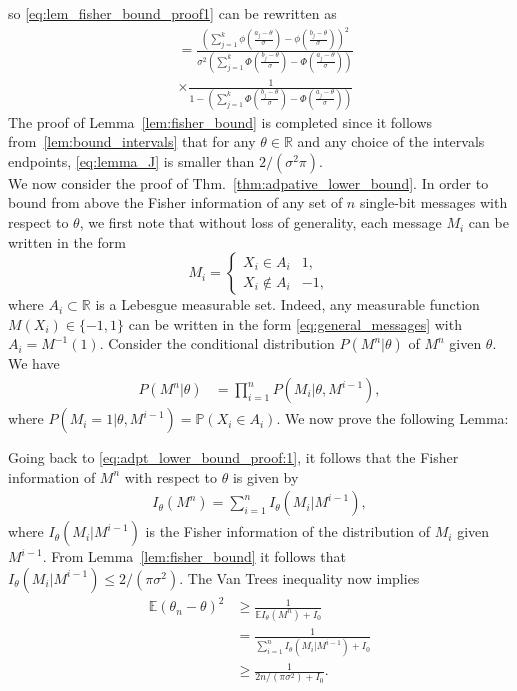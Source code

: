\documentclass[letterpaper, conference]{IEEEtran}      %
\begin{document}
so \eqref{eq:lem_fisher_bound_proof1} can be rewritten as
\begin{align}
& =   \frac { \left( \sum_{j=1}^{k} \phi \left(\frac{a_j-\theta}{\sigma} \right) - \phi \left( \frac{b_j-\theta} {\sigma} \right)  \right)^2 } 
{\sigma^2 \left( \sum_{j=1}^k \Phi \left( \frac{b_j-\theta }{\sigma}\right) - \Phi \left( \frac{a_j-\theta }{\sigma}\right)  \right) }  \nonumber \\
& \times \frac {1} 
{1- \left( \sum_{j=1}^k \Phi \left( \frac{b_j-\theta }{\sigma}\right) - \Phi \left( \frac{a_j-\theta }{\sigma}\right)  \right) } 
\label{eq:lemma_J}
\end{align}
The proof of Lemma~\ref{lem:fisher_bound} is completed since it follows from~\ref{lem:bound_intervals} that for any $\theta \in \mathbb R$ and any choice of the intervals endpoints, \eqref{eq:lemma_J} is smaller than $2/(\sigma^2 \pi)$. \\


We now consider the proof of Thm.~\ref{thm:adpative_lower_bound}. In order to bound from above the Fisher information of any set of $n$ single-bit messages with respect to $\theta$, we first note that without loss of generality, each message $M_i$ can be written in the form
\begin{equation}
\label{eq:general_messages}
M_i = \begin{cases}
X_i \in A_i & 1, \\
X_i \notin A_i & -1,
\end{cases} 
\end{equation}
where $A_i \subset \mathbb R$ is a Lebesgue measurable set. Indeed, any measurable function $M(X_i) \in \{-1,1\}$ can be written in the form \eqref{eq:general_messages} with $A_i = M^{-1}(1)$. Consider the conditional distribution $P({M^n|\theta})$ of $M^n$ given $\theta$. We have 
\begin{align}
P\left( M^n | \theta \right) & =  \prod_{i=1}^n P\left(M_i | \theta, M^{i-1} \right), \label{eq:adpt_lower_bound_proof:1}
\end{align}
where $P\left(M_i =1 | \theta, M^{i-1}  \right) = \mathbb P\left( X_i \in A_i\right)$. We now prove the following Lemma:



Going back to \eqref{eq:adpt_lower_bound_proof:1}, it follows that the Fisher information of $M^n$ with respect to $\theta$ is given by 
\begin{align}
I_\theta(M^n) = \sum_{i=1}^n I_\theta (M_i|M^{i-1}),
\label{eq:fisher_information}
\end{align}
where $I_\theta (M_i|M^{i-1})$ is the Fisher information of the distribution of $M_i$ given $M^{i-1}$. From Lemma~\ref{lem:fisher_bound} it follows that $I_\theta (M_i|M^{i-1}) \leq 2/(\pi \sigma^2)$. The Van Trees inequality \cite{van2004detection, gill1995applications} now implies 
\begin{align*}
\mathbb E \left( \theta_n - \theta \right)^2 &  \geq \frac{1}{ \mathbb E I_\theta(M^n) + I_0} \\
& = \frac{1}{ \sum_{i=1}^n I_\theta (M_i | M^{i-1} ) + I_0} \\
& \geq \frac{1}{ 2n/(\pi \sigma^2) + I_0}.
\end{align*}
\end{document}
